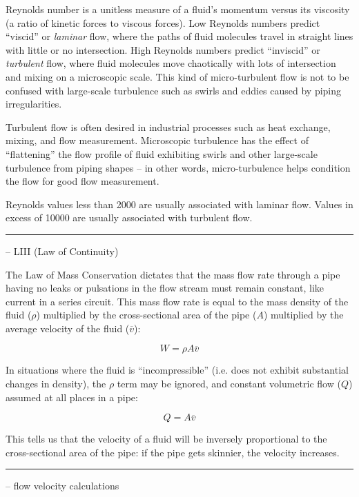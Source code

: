 Reynolds number is a unitless measure of a fluid's momentum versus its viscosity (a ratio of kinetic forces to viscous forces).  Low Reynolds numbers predict ``viscid'' or {\it laminar} flow, where the paths of fluid molecules travel in straight lines with little or no intersection.  High Reynolds numbers predict ``inviscid'' or {\it turbulent} flow, where fluid molecules move chaotically with lots of intersection and mixing on a microscopic scale.  This kind of micro-turbulent flow is not to be confused with large-scale turbulence such as swirls and eddies caused by piping irregularities.

\vskip 10pt

Turbulent flow is often desired in industrial processes such as heat exchange, mixing, and flow measurement.  Microscopic turbulence has the effect of ``flattening'' the flow profile of fluid exhibiting swirls and other large-scale turbulence from piping shapes -- in other words, micro-turbulence helps condition the flow for good flow measurement.

\vskip 10pt

Reynolds values less than 2000 are usually associated with laminar flow.  Values in excess of 10000 are usually associated with turbulent flow.


\filbreak \vskip 5pt \hrule \vskip 5pt  -- LIII (Law of Continuity) \vskip 10pt

The Law of Mass Conservation dictates that the mass flow rate through a pipe having no leaks or pulsations in the flow stream must remain constant, like current in a series circuit.  This mass flow rate is equal to the mass density of the fluid ($\rho$) multiplied by the cross-sectional area of the pipe ($A$) multiplied by the average velocity of the fluid ($\overline{v}$):

$$W = \rho A \overline{v}$$

In situations where the fluid is ``incompressible'' (i.e. does not exhibit substantial changes in density), the $\rho$ term may be ignored, and constant volumetric flow ($Q$) assumed at all places in a pipe:

$$Q = A \overline{v}$$

This tells us that the velocity of a fluid will be inversely proportional to the cross-sectional area of the pipe: if the pipe gets skinnier, the velocity increases.


\filbreak \vskip 5pt \hrule \vskip 5pt  -- flow velocity calculations \vskip 10pt

